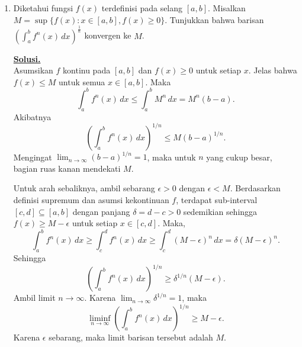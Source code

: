 \documentclass[12pt,twoside]{article}
\newenvironment{solution}
{
	\par\noindent\textbf{\underline{Solusi.}}\\
}
{
	\par
}
\begin{document}
\begin{enumerate}
\begin{solution}
          Kesimpulan: Karena kedua cara menghitung hal yang sama, maka terbukti:
          \[ \sum_{k=2}^{n}k\binom{n-2}{k-2}\binom{n+2}{k}=(n+2)\binom{2n-1}{n-1}. \]
        \end{solution}

  \item Diketahui fungsi $f(x)$ terdefinisi pada selang $[a,b]$. Misalkan $M=\sup\{f(x):x\in [a,b],f(x)\geq 0\}$. Tunjukkan bahwa barisan $\left(\displaystyle\int_{a}^{b}f^n(x)\,dx\right)^{\frac{1}{n}}$ konvergen ke $M$.
        \begin{solution}
          Asumsikan $f$ kontinu pada $[a,b]$ dan $f(x) \geq 0$ untuk setiap $x$.
          Jelas bahwa $f(x) \le M$ untuk semua $x \in [a,b]$. Maka
          $$ \int_a^b f^n(x) \, dx \le \int_a^b M^n \, dx = M^n (b-a). $$
          Akibatnya
          $$ \left(\int_a^b f^n(x) \, dx\right)^{1/n} \le M (b-a)^{1/n}. $$
          Mengingat $\lim_{n \to \infty} (b-a)^{1/n} = 1$, maka untuk $n$ yang cukup besar, bagian ruas kanan mendekati $M$.

          Untuk arah sebaliknya, ambil sebarang $\epsilon > 0$ dengan $\epsilon < M$.
          Berdasarkan definisi supremum dan asumsi kekontinuan $f$, terdapat sub-interval $[c,d] \subseteq [a,b]$ dengan panjang $\delta = d-c > 0$ sedemikian sehingga $f(x) \ge M - \epsilon$ untuk setiap $x \in [c,d]$.
          Maka,
          $$ \int_a^b f^n(x) \, dx \ge \int_c^d f^n(x) \, dx \ge \int_c^d (M-\epsilon)^n \, dx = \delta (M-\epsilon)^n. $$
          Sehingga
          $$ \left(\int_a^b f^n(x) \, dx\right)^{1/n} \ge \delta^{1/n} (M-\epsilon). $$
          Ambil limit $n \to \infty$. Karena $\lim_{n \to \infty} \delta^{1/n} = 1$, maka
          $$ \liminf_{n \to \infty} \left(\int_a^b f^n(x) \, dx\right)^{1/n} \ge M - \epsilon. $$
          Karena $\epsilon$ sebarang, maka limit barisan tersebut adalah $M$.
        \end{solution}


\end{enumerate}
\end{document}
